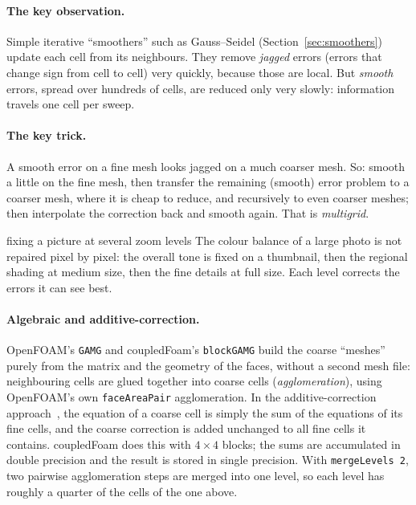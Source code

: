 \documentclass[11pt,a4paper]{article}
\newcommand{\code}[1]{\texttt{#1}}
\begin{document}
\paragraph{The key observation.} Simple iterative ``smoothers'' such as
Gauss--Seidel (Section~\ref{sec:smoothers}) update each cell from its
neighbours. They remove \emph{jagged} errors (errors that change sign from
cell to cell) very quickly, because those are local. But \emph{smooth}
errors, spread over hundreds of cells, are reduced only very slowly:
information travels one cell per sweep.

\paragraph{The key trick.} A smooth error on a fine mesh looks jagged on a
much coarser mesh. So: smooth a little on the fine mesh, then transfer the
remaining (smooth) error problem to a coarser mesh, where it is cheap to
reduce, and recursively to even coarser meshes; then interpolate the
correction back and smooth again. That is \emph{multigrid}.

\begin{intuition}{fixing a picture at several zoom levels}
  The colour balance of a large photo is not repaired pixel by pixel: the
  overall tone is fixed on a thumbnail, then the regional shading at medium
  size, then the fine details at full size. Each level
  corrects the errors it can see best.
\end{intuition}

\paragraph{Algebraic and additive-correction.} OpenFOAM's \code{GAMG} and
coupledFoam's \code{blockGAMG} build the coarse ``meshes'' purely from the
matrix and the geometry of the faces, without a second mesh file:
neighbouring cells are glued together into coarse cells
(\emph{agglomeration}), using OpenFOAM's own \code{faceAreaPair}
agglomeration. In the additive-correction
approach~\cite{Hutchinson1986,Weiss1999}, the equation of a coarse cell is
simply the sum of the equations of its fine cells, and the coarse
correction is added unchanged to all fine cells it contains. coupledFoam
does this with $4\times4$ blocks; the sums are accumulated in double
precision and the result is stored in single precision. With
\code{mergeLevels 2}, two pairwise agglomeration steps are merged into one
level, so each level has roughly a quarter of the cells of the one above.
\end{document}
